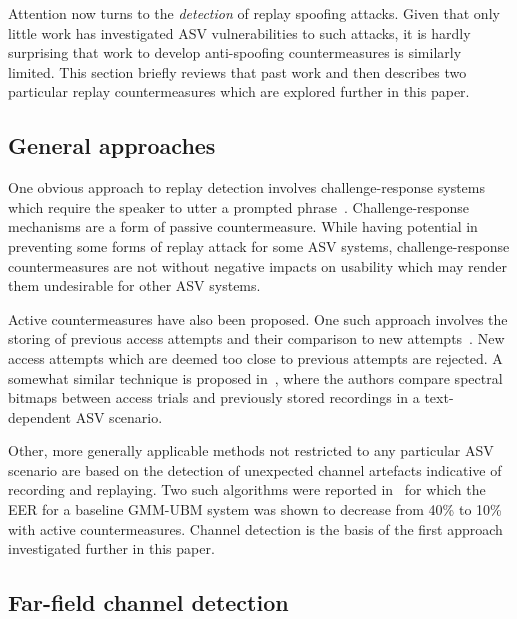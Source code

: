 
Attention now turns to the \emph{detection} of replay spoofing attacks.  Given that only little work has investigated ASV vulnerabilities to such attacks, it is hardly surprising that work to develop anti-spoofing countermeasures is similarly limited.  This section briefly reviews that past work and then describes two particular replay countermeasures which are explored further in this paper.



\subsection{General approaches}

One obvious approach to replay detection involves challenge-response systems which require the speaker to utter a prompted phrase~\cite{Petrovska1998}. 
Challenge-response mechanisms are a form of passive countermeasure.
While having potential in preventing some forms of replay attack for some ASV systems, challenge-response countermeasures are not without negative impacts on usability which may render them undesirable for other ASV systems.

Active countermeasures have also been proposed.
One such approach involves the storing of previous access attempts and their comparison to new attempts~\cite{Shang2010}.
New access attempts which are deemed too close to previous attempts are rejected.
A somewhat similar technique is proposed in~\cite{Wu2014}, where the authors compare spectral bitmaps between access trials and previously stored recordings in a text-dependent ASV scenario.

Other, more generally applicable methods not restricted to any particular ASV scenario are based on the detection of unexpected channel artefacts indicative of recording and replaying.
Two such algorithms were reported in~\cite{Wang2011} for which the EER for a baseline GMM-UBM system was shown to decrease from 40\% to 10\% with active countermeasures.  Channel detection is the basis of the first approach investigated further in this paper.



\subsection{Far-field channel detection}
\label{subsec:ffd}

